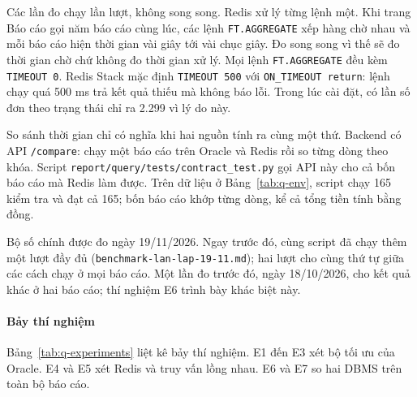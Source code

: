 Các lần đo chạy lần lượt, không song song. Redis xử lý từng lệnh một. Khi trang Báo cáo gọi năm báo cáo cùng lúc, các lệnh \texttt{FT.AGGREGATE} xếp hàng chờ nhau và mỗi báo cáo hiện thời gian vài giây tới vài chục giây. Đo song song vì thế sẽ đo thời gian chờ chứ không đo thời gian xử lý. Mọi lệnh \texttt{FT.AGGREGATE} đều kèm \texttt{TIMEOUT 0}. Redis Stack mặc định \texttt{TIMEOUT 500} với \texttt{ON\_TIMEOUT return}: lệnh chạy quá 500 ms trả kết quả thiếu mà không báo lỗi. Trong lúc cài đặt, có lần số đơn theo trạng thái chỉ ra 2.299 vì lý do này.

So sánh thời gian chỉ có nghĩa khi hai nguồn tính ra cùng một thứ. Backend có API \texttt{/compare}: chạy một báo cáo trên Oracle và Redis rồi so từng dòng theo khóa. Script \texttt{report/query/tests/contract\_test.py} gọi API này cho cả bốn báo cáo mà Redis làm được. Trên dữ liệu ở Bảng~\ref{tab:q-env}, script chạy 165 kiểm tra và đạt cả 165; bốn báo cáo khớp từng dòng, kể cả tổng tiền tính bằng đồng.

Bộ số chính được đo ngày 19/11/2026. Ngay trước đó, cùng script đã chạy thêm một lượt đầy đủ (\texttt{benchmark-lan-lap-19-11.md}); hai lượt cho cùng thứ tự giữa các cách chạy ở mọi báo cáo. Một lần đo trước đó, ngày 18/10/2026, cho kết quả khác ở hai báo cáo; thí nghiệm E6 trình bày khác biệt này.

\paragraph{Bảy thí nghiệm}\label{sec:q-design-exp}

Bảng~\ref{tab:q-experiments} liệt kê bảy thí nghiệm. E1 đến E3 xét bộ tối ưu của Oracle. E4 và E5 xét Redis và truy vấn lồng nhau. E6 và E7 so hai DBMS trên toàn bộ báo cáo.

